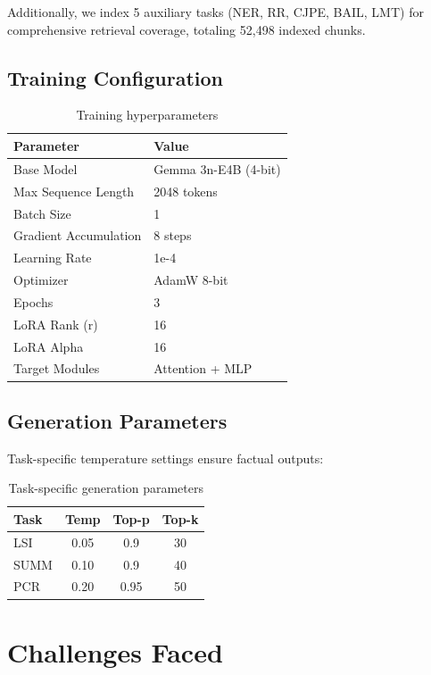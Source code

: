 \documentclass[11pt]{article}
\begin{document}
Additionally, we index 5 auxiliary tasks (NER, RR, CJPE, BAIL, LMT) for comprehensive retrieval coverage, totaling 52,498 indexed chunks.

\subsection{Training Configuration}

\begin{table}[h]
\centering
\small
\begin{tabular}{@{}ll@{}}
\toprule
\textbf{Parameter} & \textbf{Value} \\
\midrule
Base Model & Gemma 3n-E4B (4-bit) \\
Max Sequence Length & 2048 tokens \\
Batch Size & 1 \\
Gradient Accumulation & 8 steps \\
Learning Rate & 1e-4 \\
Optimizer & AdamW 8-bit \\
Epochs & 3 \\
LoRA Rank (r) & 16 \\
LoRA Alpha & 16 \\
Target Modules & Attention + MLP \\
\bottomrule
\end{tabular}
\caption{Training hyperparameters}
\label{tab:hyperparams}
\end{table}

\subsection{Generation Parameters}

Task-specific temperature settings ensure factual outputs:

\begin{table}[h]
\centering
\small
\begin{tabular}{@{}lccc@{}}
\toprule
\textbf{Task} & \textbf{Temp} & \textbf{Top-p} & \textbf{Top-k} \\
\midrule
LSI & 0.05 & 0.9 & 30 \\
SUMM & 0.10 & 0.9 & 40 \\
PCR & 0.20 & 0.95 & 50 \\
\bottomrule
\end{tabular}
\caption{Task-specific generation parameters}
\label{tab:gen_params}
\end{table}

\section{Challenges Faced}
\end{document}
